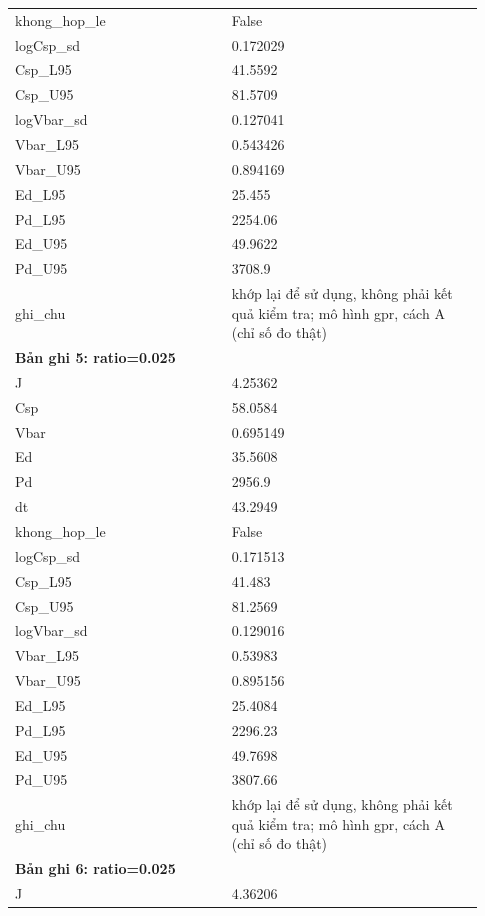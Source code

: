 \begin{longtable}{p{0.43\linewidth}p{0.50\linewidth}}
khong\_\allowbreak hop\_\allowbreak le & False \\
logCsp\_\allowbreak sd & 0.172029 \\
Csp\_\allowbreak L95 & 41.5592 \\
Csp\_\allowbreak U95 & 81.5709 \\
logVbar\_\allowbreak sd & 0.127041 \\
Vbar\_\allowbreak L95 & 0.543426 \\
Vbar\_\allowbreak U95 & 0.894169 \\
Ed\_\allowbreak L95 & 25.455 \\
Pd\_\allowbreak L95 & 2254.06 \\
Ed\_\allowbreak U95 & 49.9622 \\
Pd\_\allowbreak U95 & 3708.9 \\
ghi\_\allowbreak chu & khớp lại để sử dụng, không phải kết quả kiểm tra; mô hình gpr, cách A (chỉ số đo thật) \\
\midrule
\multicolumn{2}{p{0.95\linewidth}}{\textbf{Bản ghi 5: ratio=0.025}} \\
J & 4.25362 \\
Csp & 58.0584 \\
Vbar & 0.695149 \\
Ed & 35.5608 \\
Pd & 2956.9 \\
dt & 43.2949 \\
khong\_\allowbreak hop\_\allowbreak le & False \\
logCsp\_\allowbreak sd & 0.171513 \\
Csp\_\allowbreak L95 & 41.483 \\
Csp\_\allowbreak U95 & 81.2569 \\
logVbar\_\allowbreak sd & 0.129016 \\
Vbar\_\allowbreak L95 & 0.53983 \\
Vbar\_\allowbreak U95 & 0.895156 \\
Ed\_\allowbreak L95 & 25.4084 \\
Pd\_\allowbreak L95 & 2296.23 \\
Ed\_\allowbreak U95 & 49.7698 \\
Pd\_\allowbreak U95 & 3807.66 \\
ghi\_\allowbreak chu & khớp lại để sử dụng, không phải kết quả kiểm tra; mô hình gpr, cách A (chỉ số đo thật) \\
\midrule
\multicolumn{2}{p{0.95\linewidth}}{\textbf{Bản ghi 6: ratio=0.025}} \\
J & 4.36206 \\

\end{longtable}
